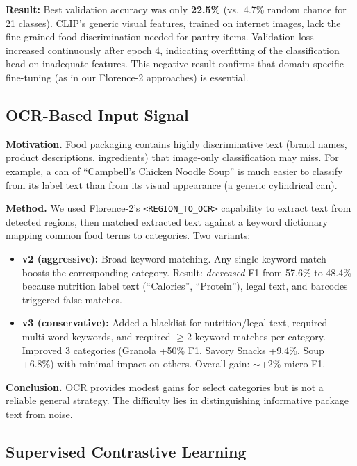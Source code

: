 \documentclass[11pt]{article}
\begin{document}
\textbf{Result:} Best validation accuracy was only \textbf{22.5\%} (vs.\ 4.7\% random chance for 21 classes). CLIP's generic visual features, trained on internet images, lack the fine-grained food discrimination needed for pantry items. Validation loss increased continuously after epoch 4, indicating overfitting of the classification head on inadequate features. This negative result confirms that domain-specific fine-tuning (as in our Florence-2 approaches) is essential.

\subsection{OCR-Based Input Signal}

\textbf{Motivation.} Food packaging contains highly discriminative text (brand names, product descriptions, ingredients) that image-only classification may miss. For example, a can of ``Campbell's Chicken Noodle Soup'' is much easier to classify from its label text than from its visual appearance (a generic cylindrical can).

\textbf{Method.} We used Florence-2's \texttt{<REGION\_TO\_OCR>} capability to extract text from detected regions, then matched extracted text against a keyword dictionary mapping common food terms to categories. Two variants:
\begin{itemize}[nosep,leftmargin=1.5em]
  \item \textbf{v2 (aggressive):} Broad keyword matching. Any single keyword match boosts the corresponding category. Result: \textit{decreased} F1 from 57.6\% to 48.4\% because nutrition label text (``Calories'', ``Protein''), legal text, and barcodes triggered false matches.
  \item \textbf{v3 (conservative):} Added a blacklist for nutrition/legal text, required multi-word keywords, and required $\geq$2 keyword matches per category. Improved 3 categories (Granola +50\% F1, Savory Snacks +9.4\%, Soup +6.8\%) with minimal impact on others. Overall gain: $\sim$+2\% micro F1.
\end{itemize}

\textbf{Conclusion.} OCR provides modest gains for select categories but is not a reliable general strategy. The difficulty lies in distinguishing informative package text from noise.

\subsection{Supervised Contrastive Learning}
\label{sec:contrastive}
\end{document}

